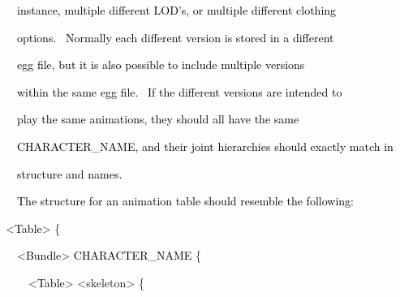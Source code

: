 \documentclass[a4paper]{article}
\newcommand\textstyleOOoComputerKeyWord[1]{\textrm{\textcolor[rgb]{0.0,0.0,0.5019608}{#1}}}
\newcommand\textstyleOOoAssemblerSpecialChar[1]{\textrm{\textcolor[rgb]{0.0,0.5019608,0.0}{#1}}}
\newcommand\textstyleOOoAssemblerIdent[1]{\textrm{\textcolor{black}{#1}}}
\newcommand\textstyleOOoAssemblerLiteral[1]{\textrm{\textcolor[rgb]{0.49803922,0.0,0.49803922}{#1}}}
\begin{document}
{\color{black}
\textstyleOOoComputerKeyWord{\textcolor{black}{\ \ instance, multiple different LOD's, or multiple different clothing}}}

{\color{black}
\textstyleOOoComputerKeyWord{\textcolor{black}{\ \ options. \ Normally each different version is stored in a
different}}}

{\color{black}
\textstyleOOoComputerKeyWord{\textcolor{black}{\ \ egg file, but it is also possible to include multiple versions}}}

{\color{black}
\textstyleOOoComputerKeyWord{\textcolor{black}{\ \ within the same egg file. \ If the different versions are intended
to}}}

{\color{black}
\textstyleOOoComputerKeyWord{\textcolor{black}{\ \ play the same animations, they should all have the same}}}

{\color{black}
\textstyleOOoComputerKeyWord{\textcolor{black}{\ \ CHARACTER\_NAME, and their joint hierarchies should exactly match
in}}}

{\color{black}
\textstyleOOoComputerKeyWord{\textcolor{black}{\ \ structure and names.}}}


\bigskip

{\color{black}
\textstyleOOoComputerKeyWord{\textcolor{black}{\ \ The structure for an animation table should resemble the
following:}}}


\bigskip

{\color{black}
\textstyleOOoAssemblerSpecialChar{{\textless}}\textstyleOOoAssemblerIdent{Table}\textstyleOOoAssemblerSpecialChar{{\textgreater}}\textstyleOOoComputerKeyWord{\textcolor{black}{
}}\textstyleOOoAssemblerSpecialChar{\{}}

{\color{black}
\textstyleOOoComputerKeyWord{\textcolor{black}{\ \ }}\textstyleOOoAssemblerSpecialChar{{\textless}}\textstyleOOoAssemblerIdent{Bundle}\textstyleOOoAssemblerSpecialChar{{\textgreater}}\textstyleOOoComputerKeyWord{\textcolor{black}{
}}\textstyleOOoAssemblerIdent{CHARACTER\_NAME}\textstyleOOoComputerKeyWord{\textcolor{black}{
}}\textstyleOOoAssemblerSpecialChar{\{}}

{\color{black}
\textstyleOOoComputerKeyWord{\textcolor{black}{\ \ \ \ }}\textstyleOOoAssemblerSpecialChar{{\textless}}\textstyleOOoAssemblerIdent{Table}\textstyleOOoAssemblerSpecialChar{{\textgreater}}\textstyleOOoComputerKeyWord{\textcolor{black}{
}}\textstyleOOoAssemblerLiteral{{\textquotedbl}{\textless}skeleton{\textgreater}{\textquotedbl}}\textstyleOOoComputerKeyWord{\textcolor{black}{
}}\textstyleOOoAssemblerSpecialChar{\{}}
\end{document}
